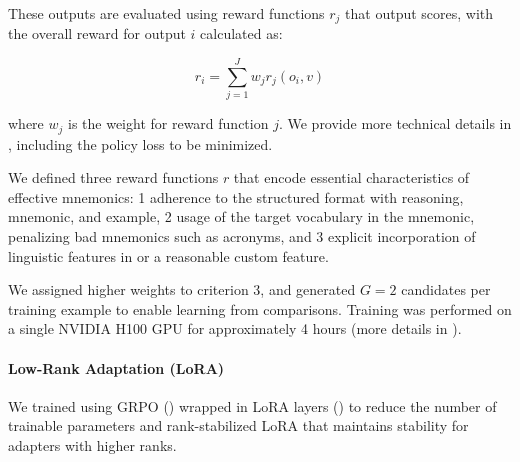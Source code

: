 These outputs are evaluated using reward functions $r_j$ that output scores, with the overall reward for output $i$ calculated as:

\begin{equation}
r_i = \sum_{j=1}^{J} w_j r_j(o_i, v)
\end{equation}

where $w_j$ is the weight for reward function $j$. We provide more technical details in , including the policy loss to be minimized.

We defined three reward functions $r$ that encode essential characteristics of effective mnemonics:
\numlist{1} adherence to the structured format with reasoning, mnemonic, and example,
\numlist{2} usage of the target vocabulary in the mnemonic, penalizing bad mnemonics such as acronyms, and
\numlist{3} explicit incorporation of linguistic features in  or a reasonable custom feature.

We assigned higher weights to criterion 3, and generated $G=2$ candidates per training example to enable learning from comparisons. Training was performed on a single NVIDIA H100 GPU for approximately 4 hours (more details in ).

\paragraph*{Low-Rank Adaptation (LoRA)} We trained \studentmodel using GRPO () wrapped in LoRA layers () to reduce the number of trainable parameters and rank-stabilized LoRA that maintains stability for adapters with higher ranks.
